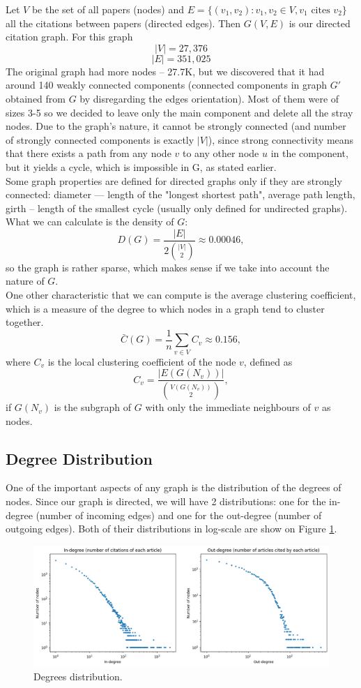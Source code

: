 \documentclass{article}
\newcommand\tab[1][1cm]{\hspace*{#1}}
\begin{document}
\tab Let $V$ be the set of all papers (nodes) and $E = \{(v_1, v_2): v_1, v_2 \in V, v_1 \text{ cites } v_2 \}$ all the citations between papers (directed edges). Then $G(V, E)$ is our directed citation graph.
For this graph $$|V| = 27,376$$ $$|E| = 351,025$$
\tab The original graph had more nodes -- 27.7K, but we discovered that it had around 140 weakly connected components (connected components in graph $G'$ obtained from $G$ by disregarding the edges orientation). Most of them were of sizes 3-5 so we decided to leave only the main component and delete all the stray nodes. Due to the graph's nature, it cannot be strongly connected (and number of strongly connected components is exactly $|V|$), since strong connectivity means that there exists a path from any node $v$ to any other node $u$ in the component, but it yields a cycle, which is impossible in G, as stated earlier. \\
\tab Some graph properties are defined for directed graphs only if they are strongly connected: diameter --- length of the "longest shortest path", average path length, girth -- length of the smallest cycle (usually only defined for undirected graphs). What we can calculate is the density of $G$:
$$D(G) = \frac{|E|}{2\binom{|V|}{2}} \approx 0.00046,$$
so the graph is rather sparse, which makes sense if we take into account the nature of $G$.\\
\tab One other characteristic that we can compute is the average clustering coefficient, which is a measure of the degree to which nodes in a graph tend to cluster together. 
$$\bar{C}(G) = \frac{1}{n}\sum_{v \in V}C_v \approx 0.156,$$
where $C_v$ is the local clustering coefficient of the node $v$, defined as $$C_v = \frac{|E(G(N_v))|}{\binom{V(G(N_v))}{2}},$$
if $G(N_v)$ is the subgraph of $G$ with only the immediate neighbours of $v$  as nodes.

\subsection{Degree Distribution}
\tab One of the important aspects of any graph is the distribution of the degrees of nodes. Since our graph is directed, we will have 2 distributions: one for the in-degree (number of incoming edges) and one for the out-degree (number of outgoing edges). Both of their distributions in log-scale are show on Figure \ref{plot:degree}.

\begin{figure}[h]
\centering
\includegraphics[width=1\linewidth]{degree_distribution.png}
\caption{Degrees distribution.}
\label{plot:degree}
\end{figure}
\end{document}
